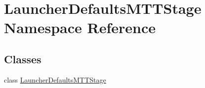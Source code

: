 \hypertarget{namespaceLauncherDefaultsMTTStage}{\section{Launcher\-Defaults\-M\-T\-T\-Stage Namespace Reference}
\label{namespaceLauncherDefaultsMTTStage}
}
\subsection*{Classes}
\begin{DoxyCompactItemize}
\item 
class \hyperlink{classLauncherDefaultsMTTStage_1_1LauncherDefaultsMTTStage}{Launcher\-Defaults\-M\-T\-T\-Stage}
\end{DoxyCompactItemize}

